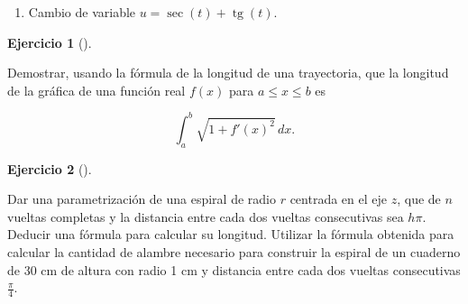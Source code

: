 \documentclass[
  spanish,
  a4paper,
]{scrreport}
\providecommand{\tightlist}{%
  \setlength{\itemsep}{0pt}\setlength{\parskip}{0pt}}
\theoremstyle{definition}
\newtheorem{exercise}{Ejercicio}[chapter]
\theoremstyle{remark}
\begin{document}
\begin{tcolorbox}
\begin{enumerate}
  \begin{enumerate}
  \def\labelenumii{(\arabic{enumii})}
  \tightlist
  \item
    Cambio de variable \(u=\sec(t)+\operatorname{tg}(t)\).
  \end{enumerate}
\end{enumerate}

\end{tcolorbox}

\begin{exercise}[]\protect\hypertarget{exr-longitud-grafica-funcion}{}\label{exr-longitud-grafica-funcion}

Demostrar, usando la fórmula de la longitud de una trayectoria, que la
longitud de la gráfica de una función real \(f(x)\) para
\(a\leq x\leq b\) es

\[
\int_a^b \sqrt{1+f'(x)^2}\, dx.
\]

\end{exercise}

\begin{exercise}[]\protect\hypertarget{exr-longitud-espiral}{}\label{exr-longitud-espiral}

Dar una parametrización de una espiral de radio \(r\) centrada en el eje
\(z\), que de \(n\) vueltas completas y la distancia entre cada dos
vueltas consecutivas sea \(h\pi\). Deducir una fórmula para calcular su
longitud. Utilizar la fórmula obtenida para calcular la cantidad de
alambre necesario para construir la espiral de un cuaderno de 30 cm de
altura con radio 1 cm y distancia entre cada dos vueltas consecutivas
\(\frac{\pi}{4}\).

\end{exercise}
\end{document}
